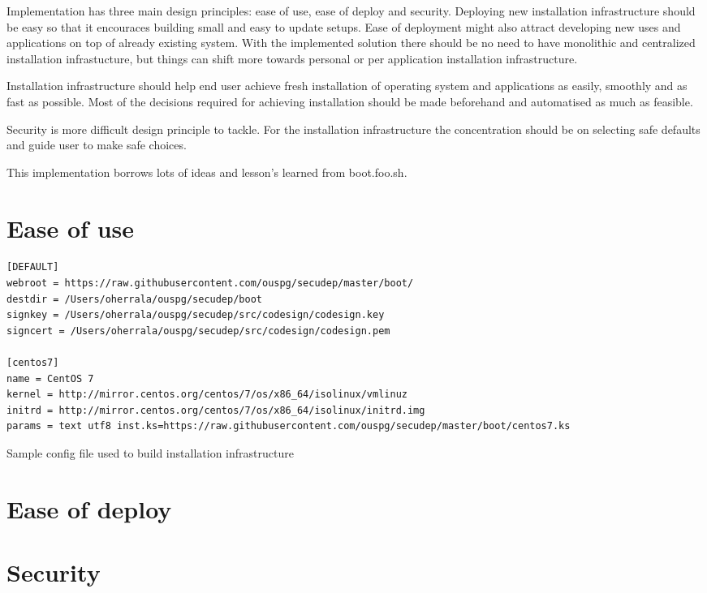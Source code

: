 
Implementation has three main design principles: ease of use, ease of
deploy and security. Deploying new installation infrastructure should
be easy so that it encouraces building small and easy to update
setups. Ease of deployment might also attract developing new uses and
applications on top of already existing system. With the implemented
solution there should be no need to have monolithic and centralized
installation infrastucture, but things can shift more towards personal
or per application installation infrastructure.

Installation infrastructure should help end user achieve fresh
installation of operating system and applications as easily, smoothly
and as fast as possible. Most of the decisions required for achieving
installation should be made beforehand and automatised as much as
feasible.

Security is more difficult design principle to tackle. For the
installation infrastructure the concentration should be on selecting
safe defaults and guide user to make safe choices.

This implementation borrows lots of ideas and lesson's learned from
boot.foo.sh\cite{boot-foo-sh}.

\section{Ease of use}

\begin{table}[!ht]
\label{list:config}
  \begin{adjustwidth}{-3.5cm}{}
    \begin{scriptsize}
\begin{verbatim}
[DEFAULT]
webroot = https://raw.githubusercontent.com/ouspg/secudep/master/boot/
destdir = /Users/oherrala/ouspg/secudep/boot
signkey = /Users/oherrala/ouspg/secudep/src/codesign/codesign.key
signcert = /Users/oherrala/ouspg/secudep/src/codesign/codesign.pem

[centos7]
name = CentOS 7
kernel = http://mirror.centos.org/centos/7/os/x86_64/isolinux/vmlinuz
initrd = http://mirror.centos.org/centos/7/os/x86_64/isolinux/initrd.img
params = text utf8 inst.ks=https://raw.githubusercontent.com/ouspg/secudep/master/boot/centos7.ks
\end{verbatim}
    \end{scriptsize}
  \end{adjustwidth}
  \begin{center}
    \caption{Sample config file used to build
        installation infrastructure}
  \end{center}
\end{table}

\section{Ease of deploy}

\section{Security}
